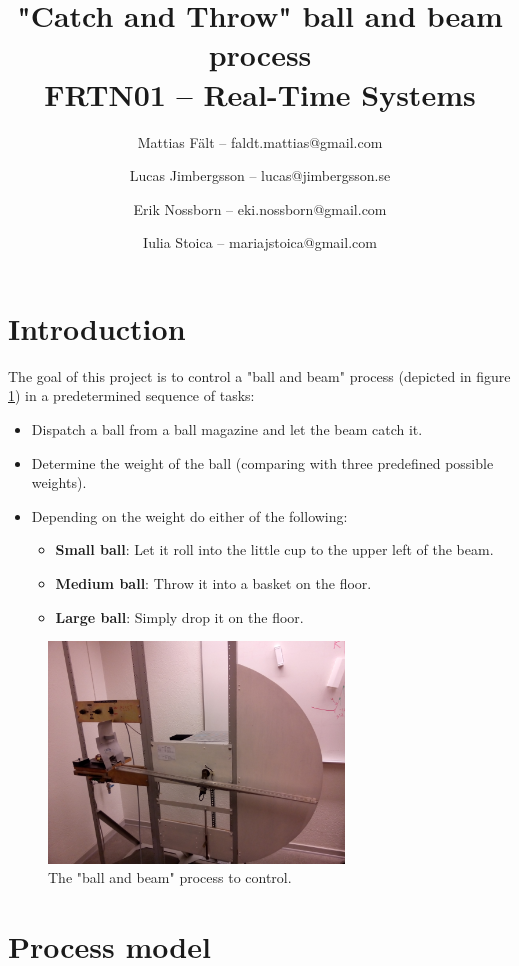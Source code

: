 \documentclass{article}
\title{"Catch and Throw" ball and beam process\\FRTN01 -- Real-Time Systems}
\author{
Mattias Fält -- faldt.mattias@gmail.com
\and
Lucas Jimbergsson -- lucas@jimbergsson.se
\and
Erik Nossborn -- eki.nossborn@gmail.com
\and
Iulia Stoica -- mariajstoica@gmail.com
}
\begin{document}
\maketitle

\section{Introduction}
The goal of this project is to control a "ball and beam" process (depicted in figure \ref{process_fig}) in a predetermined sequence of tasks:
\begin{itemize}
\item Dispatch a ball from a ball magazine and let the beam catch it.
\item Determine the weight of the ball (comparing with three predefined possible weights).
\item Depending on the weight do either of the following:
\begin{itemize}
\item \textbf{Small ball}: Let it roll into the little cup to the upper left of the beam.
\item \textbf{Medium ball}: Throw it into a basket on the floor.
\item \textbf{Large ball}: Simply drop it on the floor.
\end{itemize}
\end{itemize}
\begin{figure}
\centering
\includegraphics[width=0.7\textwidth]{figures/process_fig.jpg}
\caption{The "ball and beam" process to control.}\label{process_fig}
\end{figure}

\section{Process model}

\end{document}
